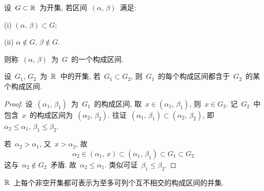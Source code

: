 \begin{definition}
设~$G \subset \mathbb{R}$~为开集, 若区间~$(\alpha,\,\beta)$~满足:

(i) $(\alpha,\,\beta) \subset G$;

(ii) $\alpha \notin G,\,\beta \notin G$.

\noindent 则称~$(\alpha,\,\beta)$~为~$G$~的一个构成区间.
\end{definition}

\begin{proposition} \label{prop151}
设~$G_1,\,G_2$~为~$\mathbb{R}$~中的开集, 若~$G_1 \subset G_2$, 则~$G_1$~的每个构成区间都含于~$G_2$~的某个构成区间.
\end{proposition}

\begin{proof}
设~$(\alpha_1,\, \beta_1)$~为~$G_1$~的构成区间, 取~$x \in (\alpha_1,\, \beta_1)$, 则~$x \in G_2$. 记~$G_2$~中包含~$x$~的构成区间为~$(\alpha_2,\, \beta_2)$. 往证~$(\alpha_1,\, \beta_1) \subset (\alpha_2,\, \beta_2)$, 即~$\alpha_2 \leqslant \alpha_1,\,\beta_1 \leqslant \beta_2$.

若~$\alpha_2 > \alpha_1$, 又~$x > \alpha_2$, 故
\[
\alpha_2 \in (\alpha_1,\,x) \subset (\alpha_1,\,\beta_1) \subset G_1 \subset G_2
\]
这与~$\alpha_2 \notin G_2$~矛盾. 故~$\alpha_2 \leqslant \alpha_1$. 类似可证~$\beta_1 \leqslant \beta_2$.
\end{proof}

\begin{theorem}  $\mathbb{R}$~上每个非空开集都可表示为至多可列个互不相交的构成区间的并集.
\end{theorem}

